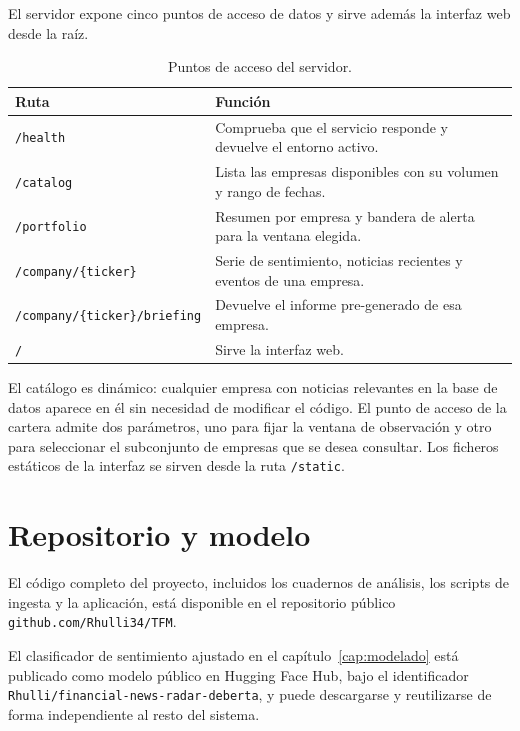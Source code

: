 El servidor expone cinco puntos de acceso de datos y sirve además la interfaz
web desde la raíz.

\begin{table}[htbp]
  \centering
  \caption{Puntos de acceso del servidor.}
  \label{tab:anx-endpoints}
  \begin{tabularx}{\textwidth}{lX}
    \toprule
    Ruta & Función \\
    \midrule
    \texttt{/health} & Comprueba que el servicio responde y devuelve el entorno activo. \\
    \texttt{/catalog} & Lista las empresas disponibles con su volumen y rango de fechas. \\
    \texttt{/portfolio} & Resumen por empresa y bandera de alerta para la ventana elegida. \\
    \texttt{/company/\{ticker\}} & Serie de sentimiento, noticias recientes y eventos de una empresa. \\
    \texttt{/company/\{ticker\}/briefing} & Devuelve el informe pre-generado de esa empresa. \\
    \texttt{/} & Sirve la interfaz web. \\
    \bottomrule
  \end{tabularx}
\end{table}

El catálogo es dinámico: cualquier empresa con noticias relevantes en la base de
datos aparece en él sin necesidad de modificar el código. El punto de acceso de
la cartera admite dos parámetros, uno para fijar la ventana de observación y
otro para seleccionar el subconjunto de empresas que se desea consultar. Los
ficheros estáticos de la interfaz se sirven desde la ruta \texttt{/static}.

\section{Repositorio y modelo}
\label{anx:repositorio}

El código completo del proyecto, incluidos los cuadernos de análisis, los
scripts de ingesta y la aplicación, está disponible en el repositorio público
\texttt{github.com/Rhulli34/TFM}.

El clasificador de sentimiento ajustado en el capítulo~\ref{cap:modelado} está
publicado como modelo público en Hugging Face Hub, bajo el identificador
\texttt{Rhulli/financial-news-radar-deberta}, y puede descargarse y reutilizarse
de forma independiente al resto del sistema.
